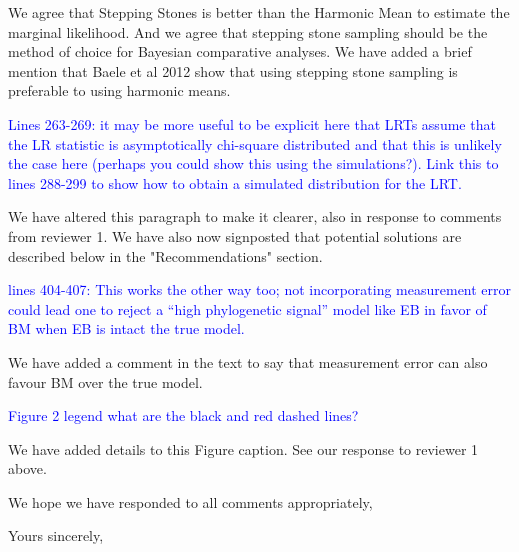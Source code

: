 \documentclass[12pt]{letter}
\begin{document}
\begin{letter}{}
We agree that Stepping Stones is better than the Harmonic Mean to estimate the marginal likelihood. And we agree that stepping stone sampling should be the method of choice for Bayesian comparative analyses. We have added a brief mention that Baele et al 2012 show that using stepping stone sampling is preferable to using harmonic means.

\textcolor{blue}{Lines 263-269: it may be more useful to be explicit here that LRTs assume that the LR statistic is asymptotically chi-square distributed and that this is unlikely the case here (perhaps you could show this using the simulations?). Link this to lines 288-299 to show how to obtain a simulated distribution for the LRT.}

We have altered this paragraph to make it clearer, also in response to comments from reviewer 1. We have also now signposted that potential solutions are described below in the "Recommendations" section.

\textcolor{blue}{lines 404-407: This works the other way too; not incorporating measurement error could lead one to reject a “high phylogenetic signal” model like EB in favor of BM when EB is intact the true model.}

We have added a comment in the text to say that measurement error can also favour BM over the true model.

\textcolor{blue}{Figure 2 legend what are the black and red dashed lines?}

We have added details to this Figure caption. See our response to reviewer 1 above.

We hope we have responded to all comments appropriately,

\closing{Yours sincerely,}

\end{letter}
\end{document}
